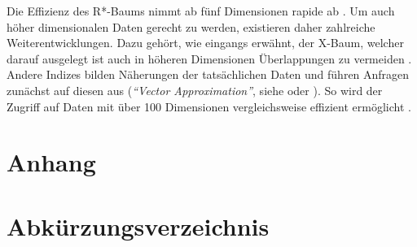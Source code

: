 \documentclass[runningheads,a4paper]{llncs}
\begin{document}
	Die Effizienz des R*-Baums nimmt ab fünf Dimensionen rapide ab \citep[vgl.][29]{Kriegel:2008}. Um auch höher dimensionalen Daten gerecht zu werden, existieren daher zahlreiche Weiterentwicklungen. Dazu gehört, wie eingangs erwähnt, der X-Baum, welcher darauf ausgelegt ist auch in höheren Dimensionen Überlappungen zu vermeiden \citep[vgl.][]{Kriegel:1996}.
	Andere Indizes bilden Näherungen der tatsächlichen Daten und führen Anfragen zunächst auf diesen aus (\emph{\enquote{Vector Approximation}}, siehe \cite{Gibas:2008} oder \cite{Daoudi:2008}). So wird der Zugriff auf Daten mit über 100 Dimensionen vergleichsweise effizient ermöglicht \citep[vgl.][]{Daoudi:2008}.
	




\newpage
\begin{appendix}

	\section*{Anhang}

	\section*{Abkürzungsverzeichnis} %
	\label{sub:abbreviations}

		\begin{acronym}[length]
	  \end{acronym}



	\nocite{*}							%

	\printbibliography

\end{appendix}
\end{document}
